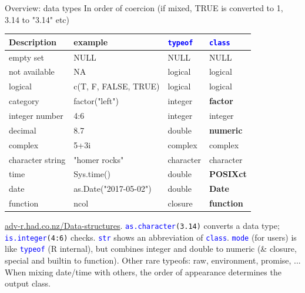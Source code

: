 \documentclass[xcolor=table,       handout,    xcolor=dvipsnames]{beamer}\usepackage[]{graphicx}\usepackage[]{color}
\newcommand{\rcode}[1]{\texttt{\textcolor{Blue}{#1}}} %
\begin{document}
\begin{frame}{Overview: data types}
\scriptsize In order of coercion (if mixed, TRUE is converted to 1,~  3.14 to "3.14" etc)
\small

\begin{center}
\begin{tabu}{| l | l | l | l |}   \hline
Description      & example         & \rcode{typeof} & \rcode{class}      \\ \hline  \hline
empty set        & NULL                 & NULL      & NULL               \\ \hline
not available    & NA                   & logical   & logical            \\ \hline
logical          & c(T, F, FALSE, TRUE) & logical   & logical            \\ \hline
category         & factor("left")       & integer   & \textbf{factor}    \\ \hline
integer number   & 4:6                  & integer   & integer            \\ \hline
decimal          & 8.7                  & double    & \textbf{numeric}   \\ \hline
complex          & 5+3i                 & complex   & complex            \\ \hline
character string & "homer rocks"        & character & character          \\ \hline
time             & Sys.time()           & double    & \textbf{POSIXct}   \\ \hline
date             & as.Date("2017-05-02")& double    & \textbf{Date}      \\ \hline
function         & ncol                 & closure   & \textbf{function}  \\ \hline
\end{tabu}
\end{center}
\scriptsize
\pause 
\href{http://adv-r.had.co.nz/Data-structures.html}{adv-r.had.co.nz/Data-structures}. 
\pause
\rcode{as.character}\texttt{(3.14)} converts a data type;  \pause \rcode{is.integer}\texttt{(4:6)} checks. \pause
\rcode{str} shows an abbreviation of \rcode{class}. \pause
\rcode{mode} (for users) is like \rcode{typeof} (R internal), but combines 
integer and double to numeric (\& closure, special and builtin to function). \pause 
Other rare typeofs: raw, environment, promise, ... \pause 
When mixing date/time with others, the order of appearance determines the output class.
\label{datatypes}
\end{frame}
\end{document}
